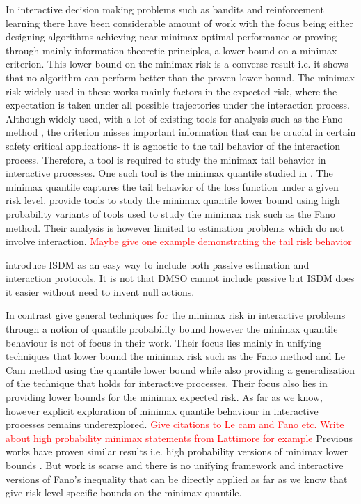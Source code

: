 \documentclass[conference]{IEEEtran}
\begin{document}
In interactive decision making problems such as bandits and reinforcement learning there have been considerable amount of work with the focus being either designing algorithms achieving near minimax-optimal performance or proving through mainly information theoretic principles, a lower bound on a minimax criterion. This lower bound on the minimax risk is a converse result i.e. it shows that
no algorithm can perform better than the proven lower bound.
The minimax risk widely used in these works mainly factors in the expected risk, where the expectation is taken under all possible trajectories under the interaction process.  Although widely used, with a lot of existing tools for analysis such as the Fano method \cite{cover1999elements,yu1997assouad,ma2024high,chen2016bayes,chen2024assouad, duchi2013distance}, the criterion misses important information that can be crucial in certain safety critical applications- it is agnostic to the tail behavior of the interaction process.
Therefore, a tool is required to study the minimax tail behavior in interactive processes.
One such tool is the minimax quantile studied in \cite{ma2024high}. 
The minimax quantile captures the tail behavior of the loss function under a given risk level. \cite{ma2024high} provide tools to study the minimax quantile lower bound using high probability variants of tools used to study the minimax risk such as the Fano method. Their analysis is however limited to estimation problems which do not involve interaction. 
\textcolor{red}{Maybe give one example demonstrating the tail risk behavior}

\cite{chen2024assouad} introduce ISDM as an easy way to include both passive estimation and interaction protocols. It is not that DMSO cannot include passive but ISDM does it easier without need to invent null actions.


In contrast \cite{chen2024assouad} give general techniques for the minimax risk in interactive problems through a notion of quantile probability bound however the minimax quantile behaviour is not of focus in their work. Their focus lies mainly in unifying techniques that lower bound the minimax risk such as the Fano method and Le Cam method \cite{lecam1973convergence, polyanskiy2014lecture} using the quantile lower bound while also providing a generalization of the technique that holds for interactive processes. Their focus also lies in providing lower bounds for the minimax expected risk. As far as we know, however explicit exploration of minimax quantile behaviour in interactive processes remains underexplored.
\textcolor{red}{Give citations to Le cam and Fano etc.}
\textcolor{red}{Write about high probability minimax statements from Lattimore for example}
Previous works have proven similar results i.e. high probability versions of minimax lower bounds \cite{lattimore2020bandit}. But work is scarse and there is no unifying framework and interactive versions of Fano's inequality that can be directly applied as far as we know that give risk level specific bounds on the minimax quantile.
\end{document}
